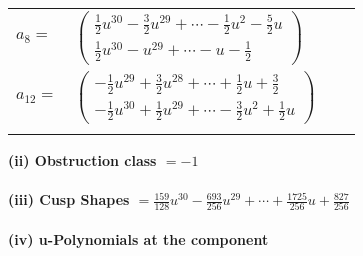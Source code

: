 \documentclass[1p]{elsarticle_modified}
\theoremstyle{definition}
\begin{document}
\begin{tabular}{m{7pt} m{180pt} m{7pt} m{180pt} }
\flushright $a_{8}=$&$\begin{pmatrix}\frac{1}{2} u^{30}-\frac{3}{2} u^{29}+\cdots-\frac{1}{2} u^2-\frac{5}{2} u\\\frac{1}{2} u^{30}- u^{29}+\cdots- u-\frac{1}{2}\end{pmatrix}$ \\
\flushright $a_{12}=$&$\begin{pmatrix}-\frac{1}{2} u^{29}+\frac{3}{2} u^{28}+\cdots+\frac{1}{2} u+\frac{3}{2}\\-\frac{1}{2} u^{30}+\frac{1}{2} u^{29}+\cdots-\frac{3}{2} u^2+\frac{1}{2} u\end{pmatrix}$\\&\end{tabular}
\flushleft \textbf{(ii) Obstruction class $= -1$}\\~\\
\flushleft \textbf{(iii) Cusp Shapes $= \frac{159}{128} u^{30}-\frac{693}{256} u^{29}+\cdots+\frac{1725}{256} u+\frac{827}{256}$}\\~\\
\newpage\renewcommand{\arraystretch}{1}
\flushleft \textbf{(iv) u-Polynomials at the component}\newline \\
\end{document}

